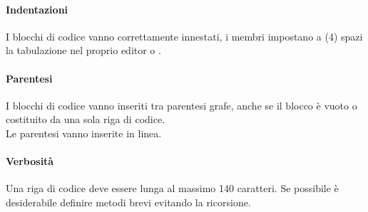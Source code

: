 \paragraph*{Indentazioni}
I blocchi di codice vanno correttamente innestati, i membri impostano a (4) spazi la tabulazione nel proprio editor o .
\paragraph*{Parentesi}
I blocchi di codice vanno inseriti tra parentesi grafe, anche se il blocco è vuoto o costituito da una sola riga di codice. \\
Le parentesi vanno inserite in linea.
\paragraph*{Verbosità}
Una riga di codice deve essere lunga al massimo 140 caratteri.
Se possibile è desiderabile definire metodi brevi evitando la ricorsione.


